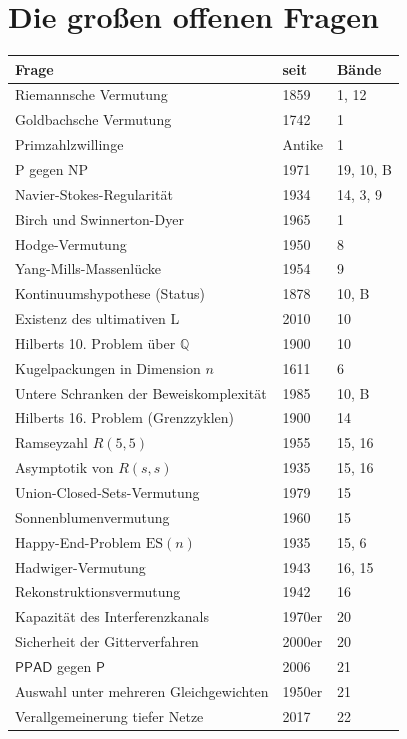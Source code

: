 \section*{Die großen offenen Fragen}
\nopagebreak
{\small\renewcommand{\arraystretch}{1.32}
\begin{longtable}{@{}P{5.0cm}P{1.6cm}P{1.8cm}@{}}
\toprule
\textbf{Frage} & \textbf{seit} & \textbf{Bände}\\
\midrule
\endhead
Riemannsche Vermutung & 1859 & 1, 12\\
Goldbachsche Vermutung & 1742 & 1\\
Primzahlzwillinge & Antike & 1\\
P gegen NP & 1971 & 19, 10, B\\
Navier-Stokes-Regularität & 1934 & 14, 3, 9\\
Birch und Swinnerton-Dyer & 1965 & 1\\
Hodge-Vermutung & 1950 & 8\\
Yang-Mills-Massenlücke & 1954 & 9\\
Kontinuumshypothese (Status) & 1878 & 10, B\\
Existenz des ultimativen L & 2010 & 10\\
Hilberts 10. Problem über $\mathbb{Q}$ & 1900 & 10\\
Kugelpackungen in Dimension $n$ & 1611 & 6\\
Untere Schranken der Beweiskomplexität & 1985 & 10, B\\
Hilberts 16. Problem (Grenzzyklen) & 1900 & 14\\
Ramseyzahl $R(5,5)$ & 1955 & 15, 16\\
Asymptotik von $R(s,s)$ & 1935 & 15, 16\\
Union-Closed-Sets-Vermutung & 1979 & 15\\
Sonnenblumenvermutung & 1960 & 15\\
Happy-End-Problem $\mathrm{ES}(n)$ & 1935 & 15, 6\\
Hadwiger-Vermutung & 1943 & 16, 15\\
Rekonstruktionsvermutung & 1942 & 16\\
Kapazität des Interferenzkanals & 1970er & 20\\
Sicherheit der Gitterverfahren & 2000er & 20\\
$\mathsf{PPAD}$ gegen $\mathsf{P}$ & 2006 & 21\\
Auswahl unter mehreren Gleichgewichten & 1950er & 21\\
Verallgemeinerung tiefer Netze & 2017 & 22\\

\end{longtable}}
